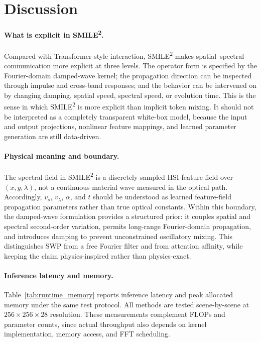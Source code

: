 \documentclass[letterpaper]{article} %
\newcommand{\smiletwo}{SMILE\textsuperscript{2}}
\newcommand{\swp}{\textsc{SWP}}
\begin{document}
\section{Discussion}

\paragraph{What is explicit in \smiletwo{}.}
Compared with Transformer-style interaction, \smiletwo{} makes spatial--spectral communication more explicit at three levels.
The operator form is specified by the Fourier-domain damped-wave kernel; the propagation direction can be inspected through impulse and cross-band responses; and the behavior can be intervened on by changing damping, spatial speed, spectral speed, or evolution time.
This is the sense in which \smiletwo{} is more explicit than implicit token mixing.
It should not be interpreted as a completely transparent white-box model, because the input and output projections, nonlinear feature mappings, and learned parameter generation are still data-driven.

\paragraph{Physical meaning and boundary.}
The spectral field in \smiletwo{} is a discretely sampled HSI feature field over \((x,y,\lambda)\), not a continuous material wave measured in the optical path.
Accordingly, \(v_s\), \(v_\lambda\), \(\alpha\), and \(t\) should be understood as learned feature-field propagation parameters rather than true optical constants.
Within this boundary, the damped-wave formulation provides a structured prior: it couples spatial and spectral second-order variation, permits long-range Fourier-domain propagation, and introduces damping to prevent unconstrained oscillatory mixing.
This distinguishes \swp{} from a free Fourier filter and from attention affinity, while keeping the claim physics-inspired rather than physics-exact.

\paragraph{Inference latency and memory.}
Table~\ref{tab:runtime_memory} reports inference latency and peak allocated memory under the same test protocol.
All methods are tested scene-by-scene at \(256\times256\times28\) resolution.
These measurements complement FLOPs and parameter counts, since actual throughput also depends on kernel implementation, memory access, and FFT scheduling.
\end{document}
